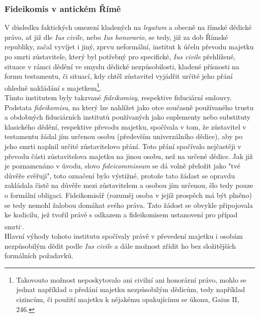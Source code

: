 \documentclass{article}
\begin{document}

\subsubsection{Fideikomis v antickém Římě}

V důsledku faktických omezení kladených na \textit{legatum} a obecně na římské dědické právo, ať již dle \textit{Ius civile}, nebo \textit{Ius honorario}, se tedy, již za dob Římské republiky, začal vyvíjet i jiný, zprvu neformální, institut k účelu převodu majetku po smrti zůstavitele, který byl potřebný pro specifické, \textit{Ius civile} přehlížené, situace v rámci dědění ve smyslu dědické nezpůsobilosti, kladené přísnosti na formu testamentu, či situací, kdy chtěl zůstavitel vyjádřit určité jeho přání ohledně nakládání s majetkem\footnote{Takovouto možnost neposkytovalo ani civilní ani honorární právo, mohlo se jednat například o předání majetku nezpůsobilým dědicům, tedy například cizincům, či použití majetku k nějakému opakujícímu se úkonu, Gaius II, 246.}.\\

 Tímto institutem byly takzvané \textit{fideikomisy}, respektive fiduciární smlouvy. Podstata \textit{fideikomisu}, na který lze nahlížet jako otce současně používaného trustu a obdobných fiduciárních institutů používaných jako suplementy nebo substituty klasického dědění, respektive převodu majetku, spočívala v tom, že zůstavitel v testamentu žádal jím určenou osobu (především univerzálního dědice), aby po jeho smrti naplnil určité zůstavitelovo přání. Toto přání spočívalo nejčastěji v převodu části zůstavitelova majetku na jinou osobu, než na určené dědice. Jak již je poznamenáno v úvodu, slovo \textit{fideicommissum} se dá volně přeložit jako "tvé důvěře svěřuji", toto označení bylo výstižné, protože tato žádast se opravdu zakládala čistě na důvěře mezi zůstavitelem a osobou jím určenou, šlo tedy pouze o formální obligaci. Fideikomisář (rozuměj osoba v jejíž prospěch má být plněno) se tedy nemohl žalobou domáhat svého práva. Tato žádost se obvykle připojovala ke kodicilu, jež tvořil právě s odkazem a fideikomisem ustanovení pro případ smrti\textsuperscript{,}. \\

Hlavní výhody tohoto institutu spočívaly právě v převedení majetku i oso\-bám nezpůsobilým dědit podle \textit{Ius civile} a dále možnost zřídit ho bez složitějších formálních požadavků.\\
\end{document}
